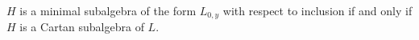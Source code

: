 $H$ is a minimal subalgebra of the form $L_{0, y}$ with respect to inclusion if and
only if $H$ is a Cartan subalgebra of $L$.
